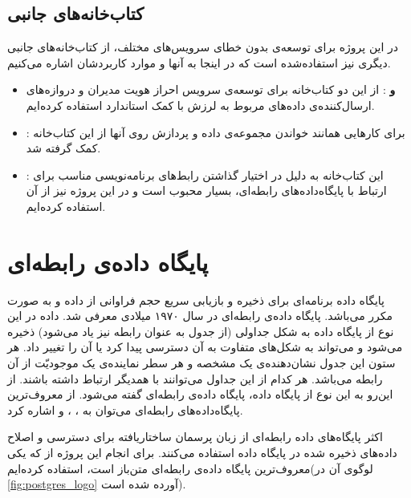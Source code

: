 \subsection{کتاب‌خانه‌‌های جانبی}
در این پروژه برای توسعه‌ی بدون خطای سرویس‌های مختلف، از کتاب‌خانه‌های جانبی دیگری نیز استفاده‌شده است که در اینجا به آنها و موارد کاربردشان اشاره می‌کنیم.
\begin{itemize}

\item \textbf{ و }: از این دو کتاب‌خانه برای توسعه‌ی سرویس احراز هویت مدیران و دروازه‌های ارسال‌کننده‌ی داده‌های مربوط به لرزش با کمک استاندارد  استفاده کرده‌ایم.

\item \textbf{}: برای کارهایی همانند خواندن مجموعه‌ی داده و پردازش روی آنها از این کتاب‌خانه کمک گرفته شد.

\item \textbf{}: این کتاب‌خانه به دلیل در اختیار گذاشتن رابط‌های برنامه‌نویسی مناسب برای ارتباط با پایگاه‌داده‌های رابطه‌ای، بسیار محبوب است و در این پروژه نیز از آن استفاده کرده‌ایم.

\end{itemize}


\section{پایگاه داده‌ی رابطه‌ای}
پایگاه داده برنامه‌ای برای ذخیره و بازیابی سریع حجم فراوانی از داده و به صورت مکرر می‌باشد. پایگاه داده‌ی رابطه‌ای در سال ۱۹۷۰ میلادی معرفی شد. داده در این نوع از پایگاه داده به شکل جداولی (از جدول به عنوان رابطه نیز یاد می‌شود) ذخیره می‌شود و می‌تواند به شکل‌های متفاوت به آن دسترسی پیدا کرد یا آن را تغییر داد. هر ستون این جدول نشان‌دهنده‌ی یک مشخصه و هر سطر نماینده‌ی یک موجودیّت از آن رابطه می‌باشد. هر کدام از این جداول می‌توانند با همدیگر ارتباط داشته‌ باشند. از این‌رو به این نوع از پایگاه داده، پایگاه داده‌ی رابطه‌ای گفته می‌شود\cite{jatana2012survey}. از معروف‌ترین پایگاه‌داده‌های رابطه‌ای می‌توان به ، ،  و  اشاره کرد.

اکثر پایگاه‌های داده رابطه‌ای از زبان پرسمان ساختاریافته برای دسترسی و اصلاح داده‌های ذخیره شده در پایگاه داده استفاده می‌کنند. برای انجام این پروژه از \href{https://www.postgresql.org/}{} که یکی معروف‌ترین پایگاه‌ داده‌ی رابطه‌ای متن‌باز است، استفاده کرده‌ایم(لوگوی آن در \cref{fig:postgres_logo}\cite{postgresqlPostgreSQL} آورده شده است).

